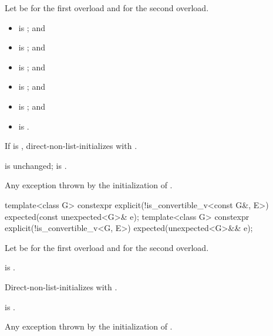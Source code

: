 \begin{itemdescr}
\pnum
Let  be  for the first overload and
 for the second overload.

\pnum
\constraints
\begin{itemize}
\item
{} is ; and
\item
{} is ; and
\item
{}
is ; and
\item
{}
is ; and
\item
{}
is ; and
\item
{}
is .
\end{itemize}

\pnum
\effects
If  is ,
direct-non-list-initializes 
with .

\pnum
\ensures
{} is unchanged;
 is .

\pnum
\throws
Any exception thrown by the initialization of .
\end{itemdescr}

%
\begin{itemdecl}
template<class G>
  constexpr explicit(!is_convertible_v<const G&, E>) expected(const unexpected<G>& e);
template<class G>
  constexpr explicit(!is_convertible_v<G, E>) expected(unexpected<G>&& e);
\end{itemdecl}

\begin{itemdescr}
\pnum
Let  be  for the first overload and
 for the second overload.

\pnum
\constraints
{} is .

\pnum
\effects
Direct-non-list-initializes 
with .

\pnum
\ensures
{} is .

\pnum
\throws
Any exception thrown by the initialization of .
\end{itemdescr}

